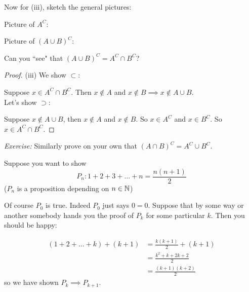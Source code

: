 \documentclass[10pt]{scrartcl}
\begin{document}
Now for (iii), sketch the general pictures:

Picture of $A^C$: 
\begin{center}
\end{center}

Picture of $(A\cup B)^C$:
\begin{center}
\end{center}

Can you ``see" that $(A\cup B)^C = A^C \cap B^C$?

\begin{proof} (iii) We show $\subset$: 

Suppose $x \in A^C \cap B^C$. Then $x \not \in A$ and $x \not \in B \implies x \not \in A\cup B$.\\

Let's show $\supset$: 

Suppose $x \not \in A\cup B$, then $x \not \in A $ and $x \not \in B$. So $x \in A^C$ and $x \in B^C$. So $x \in A^C \cap B^C$. 
\end{proof}

\emph{Exercise:} Similarly prove on your own that $(A\cap B)^C = A^C \cup B^C$.





Suppose you want to show
\[P_n: 1 + 2 + 3 + \dots + n = \frac{n(n+1)}{2}\]
($P_n$ is a proposition depending on $n\in\mathbb{N}$)

Of course $P_0$ is true. Indeed $P_0$ just says $0 = 0$. Suppose that by some way or another somebody hands you the proof of $P_k$ for some particular $k$. Then you should be happy: 

\[\begin{aligned}
(1+2+\dots + k) + (k+1) &= \frac{k(k+1)}{2} + (k+1)\\
&= \frac{k^2 + k + 2k + 2}{2}\\
&= \frac{(k+1)(k+2)}{2}	
\end{aligned}
\]
so we have shown $P_k \implies P_{k+1}$.\\
\end{document}
